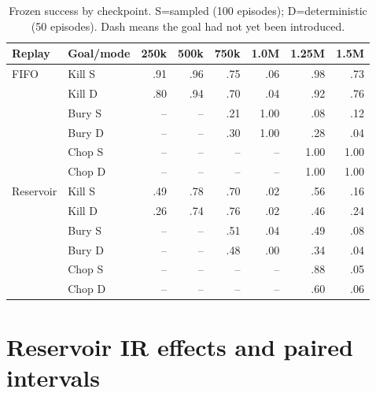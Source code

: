 \documentclass[10pt]{article}
\begin{document}
\begin{table}[H]
\centering
\small
\caption{Frozen success by checkpoint. S=sampled (100 episodes); D=deterministic (50 episodes). Dash means the goal had not yet been introduced.}
\begin{tabular}{llrrrrrr}
\toprule
Replay & Goal/mode & 250k & 500k & 750k & 1.0M & 1.25M & 1.5M \\
\midrule
FIFO & Kill S & .91 & .96 & .75 & .06 & .98 & .73 \\
     & Kill D & .80 & .94 & .70 & .04 & .92 & .76 \\
     & Bury S & -- & -- & .21 & 1.00 & .08 & .12 \\
     & Bury D & -- & -- & .30 & 1.00 & .28 & .04 \\
     & Chop S & -- & -- & -- & -- & 1.00 & 1.00 \\
     & Chop D & -- & -- & -- & -- & 1.00 & 1.00 \\
\midrule
Reservoir & Kill S & .49 & .78 & .70 & .02 & .56 & .16 \\
          & Kill D & .26 & .74 & .76 & .02 & .46 & .24 \\
          & Bury S & -- & -- & .51 & .04 & .49 & .08 \\
          & Bury D & -- & -- & .48 & .00 & .34 & .04 \\
          & Chop S & -- & -- & -- & -- & .88 & .05 \\
          & Chop D & -- & -- & -- & -- & .60 & .06 \\
\bottomrule
\end{tabular}
\end{table}

\section{Reservoir IR effects and paired intervals}
\end{document}
